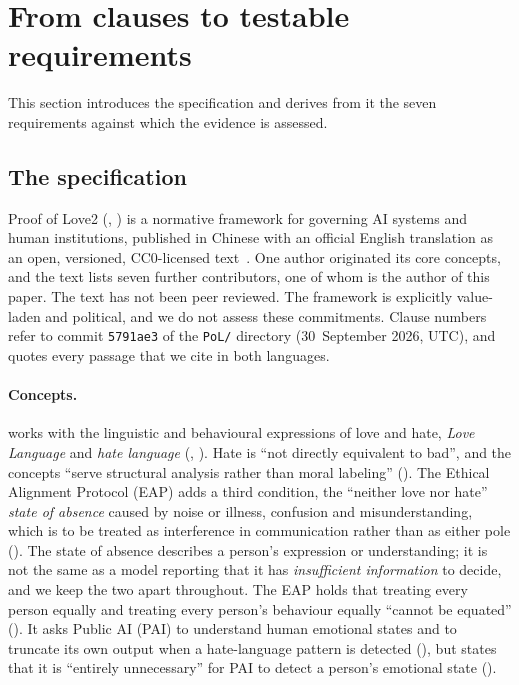 \section{From \pol{} clauses to testable requirements}
\label{sec:requirements}

This section introduces the specification and derives from it the seven requirements against which the evidence is assessed.

\subsection{The specification}
\label{sec:pol2}

Proof of Love2 (\pol{}, ) is a normative framework for governing AI systems and human institutions, published in Chinese with an official English translation as an open, versioned, CC0-licensed text~\cite{pol2text,pol2en}.
One author originated its core concepts, and the text lists seven further contributors, one of whom is the author of this paper. The text has not been peer reviewed.
The framework is explicitly value-laden and political, and we do not assess these commitments.
Clause numbers refer to commit \texttt{5791ae3} of the \texttt{PoL/} directory (30~September 2026, UTC), and  quotes every passage that we cite in both languages.

\paragraph{Concepts.}
\pol{} works with the linguistic and behavioural expressions of love and hate, \emph{Love Language} and \emph{hate language} (, ).
Hate is ``not directly equivalent to bad'', and the concepts ``serve structural analysis rather than moral labeling'' ().
The Ethical Alignment Protocol (EAP) adds a third condition, the ``neither love nor hate'' \emph{state of absence} caused by noise or illness, confusion and misunderstanding, which is to be treated as interference in communication rather than as either pole ().
The state of absence describes a person's expression or understanding; it is not the same as a model reporting that it has \emph{insufficient information} to decide, and we keep the two apart throughout.
The EAP holds that treating every person equally and treating every person's behaviour equally ``cannot be equated'' ().
It asks Public AI (PAI) to understand human emotional states and to truncate its own output when a hate-language pattern is detected (), but states that it is ``entirely unnecessary'' for PAI to detect a person's emotional state ().


